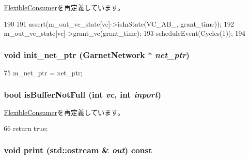 \hyperlink{classFlexibleConsumer_a775e8414113748731990f3979cdd4632}{FlexibleConsumer}を再定義しています。


\begin{DoxyCode}
190 {
191     assert(m_out_vc_state[vc]->isInState(VC_AB_, grant_time));
192     m_out_vc_state[vc]->grant_vc(grant_time);
193     scheduleEvent(Cycles(1));
194 }
\end{DoxyCode}
\hypertarget{classNetworkInterface_ab5da6a3c41f86ad2993eb11f4894ef00}{
\subsubsection[{init\_\-net\_\-ptr}]{\setlength{\rightskip}{0pt plus 5cm}void init\_\-net\_\-ptr ({\bf GarnetNetwork} $\ast$ {\em net\_\-ptr})}}
\label{classNetworkInterface_ab5da6a3c41f86ad2993eb11f4894ef00}



\begin{DoxyCode}
75 { m_net_ptr = net_ptr; }
\end{DoxyCode}
\hypertarget{classNetworkInterface_af3465adbf20f8764ea878ce2d28d2bc8}{
\subsubsection[{isBufferNotFull}]{\setlength{\rightskip}{0pt plus 5cm}bool isBufferNotFull (int {\em vc}, \/  int {\em inport})}}
\label{classNetworkInterface_af3465adbf20f8764ea878ce2d28d2bc8}


\hyperlink{classFlexibleConsumer_aa3732d20c1f3f94fb27ef60ac660f363}{FlexibleConsumer}を再定義しています。


\begin{DoxyCode}
66 { return true; }
\end{DoxyCode}
\hypertarget{classNetworkInterface_ac55fe386a101fbae38c716067c9966a0}{
\subsubsection[{print}]{\setlength{\rightskip}{0pt plus 5cm}void print (std::ostream \& {\em out}) const}}
\label{classNetworkInterface_ac55fe386a101fbae38c716067c9966a0}


